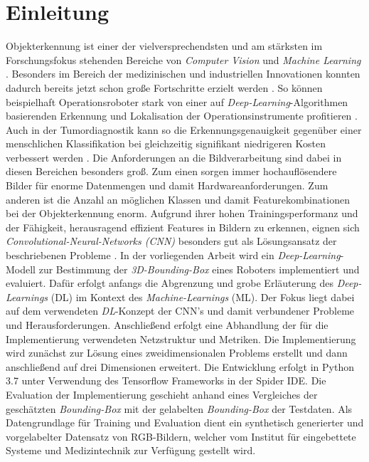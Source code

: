 \section{Einleitung}

Objekterkennung ist einer der vielversprechendsten und am stärksten im Forschungsfokus stehenden Bereiche von \textit{Computer Vision} und \textit{Machine Learning} \cite{Ouyang2014}. Besonders im Bereich der medizinischen und industriellen Innovationen konnten dadurch bereits jetzt schon große Fortschritte erzielt werden  \cite{Tremblay1809, Abstract2016}. So können beispielhaft Operationsroboter stark von einer auf \textit{Deep-Learning}-Algorithmen basierenden Erkennung und Lokalisation der Operationsinstrumente profitieren \cite{Surgery1803}. Auch in der Tumordiagnostik kann so die Erkennungsgenauigkeit gegenüber einer menschlichen Klassifikation bei gleichzeitig signifikant niedrigeren Kosten verbessert werden \cite{Cruz-Roa2017}.\newline
Die Anforderungen an die Bildverarbeitung sind dabei in diesen Bereichen besonders groß. Zum einen sorgen immer hochauflösendere Bilder für enorme Datenmengen und damit Hardwareanforderungen. Zum anderen ist die Anzahl an möglichen Klassen und damit Featurekombinationen bei der Objekterkennung enorm. Aufgrund ihrer hohen Trainingsperformanz und der Fähigkeit, herausragend effizient Features in Bildern zu erkennen, eignen sich \textit{Convolutional-Neural-Networks (CNN)} besonders gut als Lösungsansatz der beschriebenen Probleme \cite{Ouyang2014}.\newline
In der vorliegenden Arbeit wird ein \textit{Deep-Learning}-Modell zur Bestimmung der \textit{3D-Bounding-Box} eines Roboters implementiert und evaluiert.  Dafür erfolgt anfangs die Abgrenzung und grobe Erläuterung des \textit{Deep-Learnings} (DL) im Kontext des \textit{Machine-Learnings} (ML). Der Fokus liegt dabei auf dem verwendeten \textit{DL}-Konzept der CNN's und damit verbundener Probleme und Herausforderungen. Anschließend erfolgt eine Abhandlung der für die Implementierung verwendeten Netzstruktur und Metriken. Die Implementierung wird zunächst zur Lösung eines zweidimensionalen Problems erstellt und dann anschließend auf drei Dimensionen erweitert. Die Entwicklung erfolgt in Python 3.7 unter Verwendung des Tensorflow Frameworks in der Spider IDE. Die Evaluation der Implementierung geschieht anhand eines Vergleiches der geschätzten \textit{Bounding-Box} mit der gelabelten \textit{Bounding-Box} der Testdaten. Als Datengrundlage für Training und Evaluation dient ein synthetisch generierter und vorgelabelter Datensatz von RGB-Bildern, welcher vom Institut für eingebettete Systeme und Medizintechnik zur Verfügung gestellt wird.   